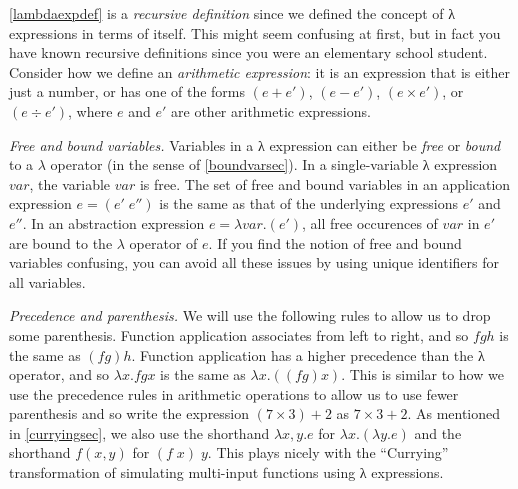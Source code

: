 \hypertarget{lambdaexpdef}{}

\cref{lambdaexpdef} is a \emph{recursive definition} since we defined
the concept of λ expressions in terms of itself. This might seem
confusing at first, but in fact you have known recursive definitions
since you were an elementary school student. Consider how we define an
\emph{arithmetic expression}: it is an expression that is either just a
number, or has one of the forms \((e + e')\), \((e - e')\),
\((e \times e')\), or \((e \div e')\), where \(e\) and \(e'\) are other
arithmetic expressions.

\emph{Free and bound variables.} Variables in a λ expression can either
be \emph{free} or \emph{bound} to a \(\lambda\) operator (in the sense
of \cref{boundvarsec}). In a single-variable λ expression \(var\), the
variable \(var\) is free. The set of free and bound variables in an
application expression \(e = (e' \; e'')\) is the same as that of the
underlying expressions \(e'\) and \(e''\). In an abstraction expression
\(e = \lambda var.(e')\), all free occurences of \(var\) in \(e'\) are
bound to the \(\lambda\) operator of \(e\). If you find the notion of
free and bound variables confusing, you can avoid all these issues by
using unique identifiers for all variables.

\emph{Precedence and parenthesis.} We will use the following rules to
allow us to drop some parenthesis. Function application associates from
left to right, and so \(fgh\) is the same as \((fg)h\). Function
application has a higher precedence than the λ operator, and so
\(\lambda x.fgx\) is the same as \(\lambda x.((fg)x)\). This is similar
to how we use the precedence rules in arithmetic operations to allow us
to use fewer parenthesis and so write the expression
\((7 \times 3) + 2\) as \(7\times 3 + 2\). As mentioned in
\cref{curryingsec}, we also use the shorthand \(\lambda x,y.e\) for
\(\lambda x.(\lambda y.e)\) and the shorthand \(f(x,y)\) for
\((f\; x)\; y\). This plays nicely with the ``Currying'' transformation
of simulating multi-input functions using λ expressions.

